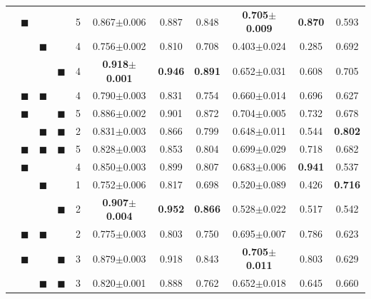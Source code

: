 \documentclass[11pt]{article}
\newcommand{\bs}[0]{$\blacksquare$}
\newcommand{\albert}{\mbox{AlBERTo}}
\begin{document}
\begin{table}[t]
\begin{tabular}{l|c@{\hspace{1mm}}c@{\hspace{1mm}}c@{\hspace{1mm}}|c@{\hspace{1mm}}|ccc|ccc}
        &  \bs  &      &      &      5 &      0.867$\pm$0.006 &     0.887 &       0.848 &  \bf  0.705$\pm$0.009 & \bf  0.870 &       0.593 \\ %
        &       &  \bs &      &      4 &      0.756$\pm$0.002 &     0.810 &       0.708 &       0.403$\pm$0.024 &      0.285 &       0.692 \\ %
        &       &      &  \bs &      4 & \bf  0.918$\pm$0.001 & \bf 0.946 &  \bf  0.891 &       0.652$\pm$0.031 &      0.608 &       0.705 \\ %
        &  \bs  &  \bs &      &      4 &      0.790$\pm$0.003 &     0.831 &       0.754 &       0.660$\pm$0.014 &      0.696 &       0.627 \\ %
        &  \bs  &      &  \bs &      5 &      0.886$\pm$0.002 &     0.901 &       0.872 &       0.704$\pm$0.005 &      0.732 &       0.678 \\ %
        &       &  \bs &  \bs &      2 &      0.831$\pm$0.003 &     0.866 &       0.799 &       0.648$\pm$0.011 &      0.544 &  \bf  0.802 \\ %
        &  \bs  &  \bs &  \bs &      5 &      0.828$\pm$0.003 &     0.853 &       0.804 &       0.699$\pm$0.029 &      0.718 &       0.682 \\ %
        \hline
        \hline
        \multirow{7}{*}[0pt]{\rotatebox[origin=c]{90}{\begin{minipage}{1.7cm}\albert\end{minipage}}}
        &  \bs  &      &      &      4 &      0.850$\pm$0.003 &     0.899 &       0.807 &       0.683$\pm$0.006 & \bf  0.941 &       0.537 \\ %
        &       &  \bs &      &      1 &      0.752$\pm$0.006 &     0.817 &       0.698 &       0.520$\pm$0.089 &      0.426 &  \bf  0.716 \\ %
        &       &      &  \bs &      2 & \bf  0.907$\pm$0.004 & \bf 0.952 &  \bf  0.866 &       0.528$\pm$0.022 &      0.517 &       0.542 \\ %
        &  \bs  &  \bs &      &      2 &      0.775$\pm$0.003 &     0.803 &       0.750 &       0.695$\pm$0.007 &      0.786 &       0.623 \\ %
        &  \bs  &      &  \bs &      3 &      0.879$\pm$0.003 &     0.918 &       0.843 &  \bf  0.705$\pm$0.011 &      0.803 &       0.629 \\ %
        &       &  \bs &  \bs &      3 &      0.820$\pm$0.001 &     0.888 &       0.762 &       0.652$\pm$0.018 &      0.645 &       0.660 \\ %

\end{tabular}
\end{table}
\end{document}
